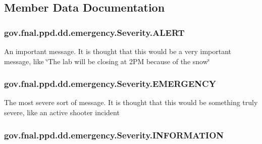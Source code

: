 \subsection{Member Data Documentation}
\hypertarget{enumgov_1_1fnal_1_1ppd_1_1dd_1_1emergency_1_1Severity_ab2b0f7c4e6222e22432f49393a71091c}{
\subsubsection[{A\-L\-E\-R\-T}]{\setlength{\rightskip}{0pt plus 5cm}gov.\-fnal.\-ppd.\-dd.\-emergency.\-Severity.\-A\-L\-E\-R\-T}}\label{enumgov_1_1fnal_1_1ppd_1_1dd_1_1emergency_1_1Severity_ab2b0f7c4e6222e22432f49393a71091c}
An important message. It is thought that this would be a very important message, like \char`\"{}\-The lab will be closing at 2\-P\-M because of the snow\char`\"{} \hypertarget{enumgov_1_1fnal_1_1ppd_1_1dd_1_1emergency_1_1Severity_a611bc0cf1463a7419a9d2cd14c683578}{
\subsubsection[{E\-M\-E\-R\-G\-E\-N\-C\-Y}]{\setlength{\rightskip}{0pt plus 5cm}gov.\-fnal.\-ppd.\-dd.\-emergency.\-Severity.\-E\-M\-E\-R\-G\-E\-N\-C\-Y}}\label{enumgov_1_1fnal_1_1ppd_1_1dd_1_1emergency_1_1Severity_a611bc0cf1463a7419a9d2cd14c683578}
The most severe sort of message. It is thought that this would be something truly severe, like an active shooter incident \hypertarget{enumgov_1_1fnal_1_1ppd_1_1dd_1_1emergency_1_1Severity_aaf755550765aa7e569baf503397ecd12}{
\subsubsection[{I\-N\-F\-O\-R\-M\-A\-T\-I\-O\-N}]{\setlength{\rightskip}{0pt plus 5cm}gov.\-fnal.\-ppd.\-dd.\-emergency.\-Severity.\-I\-N\-F\-O\-R\-M\-A\-T\-I\-O\-N}}\label{enumgov_1_1fnal_1_1ppd_1_1dd_1_1emergency_1_1Severity_aaf755550765aa7e569baf503397ecd12}
